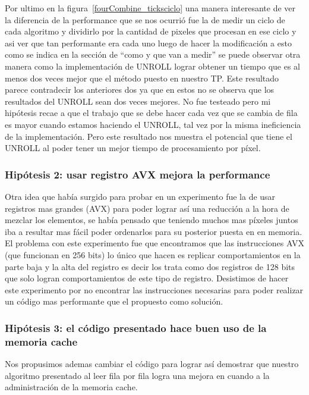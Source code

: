 Por ultimo en la figura~\ref{fourCombine_ticksciclo} una manera interesante de ver la diferencia de la performance que se nos ocurrió fue la de medir un ciclo de cada algoritmo y dividirlo por la cantidad de pixeles que procesan en ese ciclo y asi ver que tan performante era cada uno luego de hacer la modificación a esto como se indica en la sección de ``como y que van a medir'' se puede observar otra manera como la implementación de UNROLL lograr obtener un tiempo que es al menos dos veces mejor que el método puesto en nuestro TP. Este resultado parece contradecir los anteriores dos ya que en estos no se observa que los resultados del UNROLL sean dos veces mejores. No fue testeado pero mi hipótesis recae a que el trabajo que se debe hacer cada vez que se cambia de fila es mayor cuando estamos haciendo el UNROLL, tal vez por la misma ineficiencia de la implementación. Pero este resultado nos muestra el potencial que tiene el UNROLL al poder tener un mejor tiempo de procesamiento por píxel.


\subsubsection*{Hipótesis 2: usar registro AVX mejora la performance}
Otra idea que había surgido para probar en un experimento fue la de usar registros mas grandes (AVX) para poder lograr así una reducción a la hora de mezclar los elementos, se había pensado que teniendo muchos mas píxeles juntos iba a resultar mas fácil poder ordenarlos para su posterior puesta en en memoria. El problema con este experimento fue que encontramos que las instrucciones AVX (que funcionan en 256 bits) lo único que hacen es replicar comportamientos en la parte baja y la alta del registro es decir los trata como dos registros de 128 bits que solo logran comportamientos de este tipo de registro. Desistimos de hacer este experimento por no encontrar las instrucciones necesarias para poder realizar un código mas performante que el propuesto como solución.

\subsubsection*{Hipótesis 3: el código presentado hace buen uso de la memoria cache}
Nos propusimos ademas cambiar el código para lograr así demostrar que nuestro algoritmo presentado al leer fila por fila logra una mejora en cuando a la administración de la memoria cache. 

